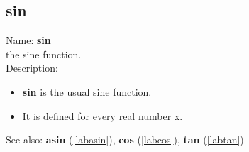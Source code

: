 \subsection{sin}
\label{labsin}
\noindent Name: \textbf{sin}\\
the sine function.\\
\noindent Description: \begin{itemize}

\item \textbf{sin} is the usual sine function.

\item It is defined for every real number x.
\end{itemize}
See also: \textbf{asin} (\ref{labasin}), \textbf{cos} (\ref{labcos}), \textbf{tan} (\ref{labtan})

